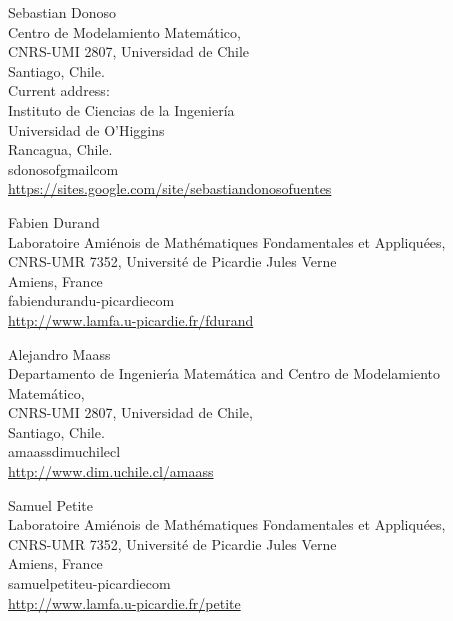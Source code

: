 \documentclass{daj}
\theoremstyle{plain}
\theoremstyle{definition}
\begin{document}
\begin{dajauthors}
\begin{authorinfo}[Sebastian]
  Sebastian Donoso\\ 
  Centro de Modelamiento Matem\'atico,\\
  CNRS-UMI 2807, Universidad de Chile\\
  Santiago, Chile.\\
  Current address: \\
  Instituto de Ciencias de la Ingenier\'ia \\
  Universidad de O'Higgins\\
  Rancagua, Chile.\\  
  sdonosof\imageat{}gmail\imagedot{}com \\
  \url{https://sites.google.com/site/sebastiandonosofuentes}
\end{authorinfo}
\begin{authorinfo}[Fabien]
  Fabien Durand\\
Laboratoire Ami\'enois de Math\'ematiques Fondamentales et Appliqu\'ees,\\ 
CNRS-UMR 7352, Universit\'{e} de Picardie Jules Verne\\
  Amiens, France\\
  fabien\imagedot{}durand\imageat{}u-picardie\imagedot{}com \\
  \url{http://www.lamfa.u-picardie.fr/fdurand}
\end{authorinfo}
\begin{authorinfo}[Alejandro]
  Alejandro Maass\\
Departamento de Ingenier\'{\i}a
Matem\'atica and Centro de Modelamiento Ma\-te\-m\'a\-ti\-co,\\
CNRS-UMI 2807, Universidad de Chile,  \\
Santiago, Chile.\\
amaass\imageat{}dim\imagedot{}uchile\imagedot{}cl\\
  \url{http://www.dim.uchile.cl/amaass}
\end{authorinfo}
\begin{authorinfo}[Samuel]
  Samuel Petite\\
   Laboratoire Ami\'enois de Math\'ematiques Fondamentales et Appliqu\'ees,\\ 
  CNRS-UMR 7352, Universit\'{e} de Picardie Jules Verne\\
  Amiens, France\\
  samuel\imagedot{}petite\imageat{}u-picardie\imagedot{}com \\
  \url{http://www.lamfa.u-picardie.fr/petite}
\end{authorinfo}
\end{dajauthors}
\end{document}
